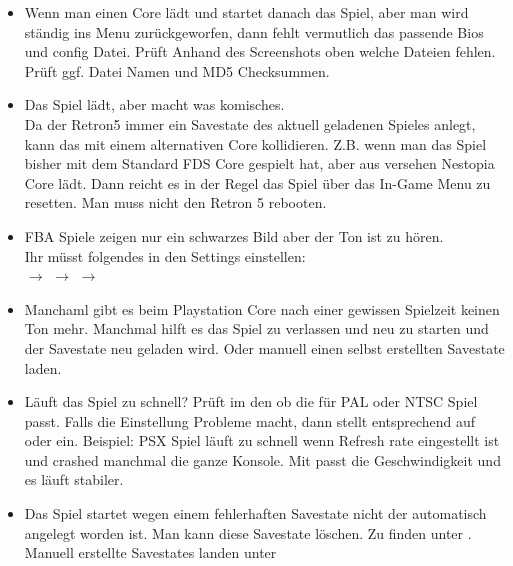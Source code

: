 \documentclass[a4paper]{article}
\begin{document}
\begin{itemize}
  \item Wenn man einen Core l\"adt und startet danach das Spiel, aber man wird st\"andig ins Menu zur\"uckgeworfen, dann fehlt vermutlich das passende Bios und config Datei. Pr\"uft Anhand des Screenshots oben welche Dateien fehlen. Pr\"uft ggf. Datei Namen und MD5 Checksummen.
  \item Das Spiel l\"adt, aber macht was komisches. \\
Da der Retron5 immer ein Savestate des aktuell geladenen Spieles anlegt, kann das mit einem alternativen Core kollidieren. Z.B. wenn man das Spiel bisher mit dem Standard FDS Core gespielt hat, aber aus versehen Nestopia Core l\"adt. Dann reicht es in der Regel das Spiel \"uber das In-Game Menu zu resetten. Man muss nicht den Retron 5 rebooten.
  \item FBA Spiele zeigen nur ein schwarzes Bild aber der Ton ist zu h\"oren. \\
Ihr m\"usst folgendes in den Settings einstellen: \\
 $\rightarrow$  $\rightarrow$  $\rightarrow$ 
  \item Manchaml gibt es beim Playstation Core nach einer gewissen Spielzeit keinen Ton mehr. Manchmal hilft es das Spiel zu verlassen und neu zu starten und der Savestate neu geladen wird. Oder manuell einen selbst erstellten Savestate laden.
  \item L\"auft das Spiel zu schnell? Pr\"uft im den  ob die  f\"ur PAL oder NTSC Spiel passt. Falls die Einstellung  Probleme macht, dann stellt entsprechend auf  oder  ein. Beispiel: PSX Spiel  l\"auft zu schnell wenn  Refresh rate eingestellt ist und crashed manchmal die ganze Konsole. Mit  passt die Geschwindigkeit und es l\"auft stabiler.
  \item Das Spiel startet wegen einem fehlerhaften Savestate nicht der automatisch angelegt worden ist. Man kann diese Savestate  l\"oschen. Zu finden unter . Manuell erstellte Savestates landen unter 
\end{itemize}

\glsaddallunused
\printglossary[title=Dateiformate, toctitle=Unterst\"utzte Dateiformate f\"ur ROMs, type=file-type, nonumberlist]
\end{document}
